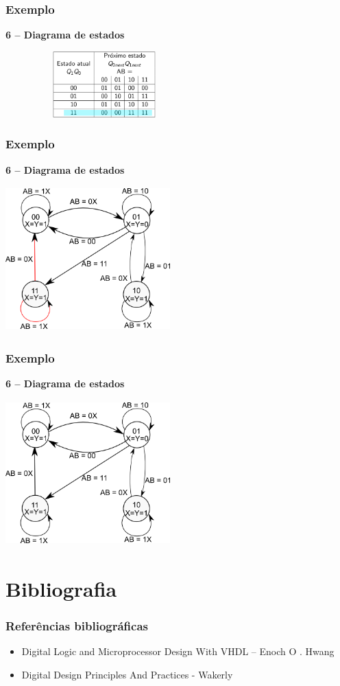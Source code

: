 \documentclass{beamer}
\begin{document}
\begin{frame}
  \frametitle{Exemplo}
  \textbf{6 – Diagrama de estados}
  \begin{center}
   \includegraphics[height = 1in, width = 3in]
    {images/Diagrama_estado_tabela_4.png}
  \end{center}
\end{frame}

\begin{frame}
  \frametitle{Exemplo}
  \textbf{6 – Diagrama de estados}
  \begin{center}
   \includegraphics[height = 2.2in, width = 2.5in]
    {images/Diagrama_de_estado_ex6.png}
  \end{center}
\end{frame}

\begin{frame}
  \frametitle{Exemplo}
  \textbf{6 – Diagrama de estados}
  \begin{center}
   \includegraphics[height = 2.2in, width = 2.5in]
    {images/Diagrama_de_estado_ex7.png}
  \end{center}
\end{frame}

\section{Bibliografia}
\begin{frame}
 \frametitle{Referências bibliográficas}
 \begin{itemize}
  \item Digital Logic and Microprocessor Design With VHDL – Enoch O . Hwang
  \item Digital Design Principles And Practices - Wakerly
 \end{itemize}
\end{frame}
\end{document}
